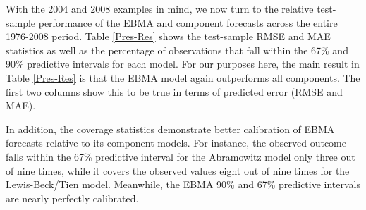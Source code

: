 With the 2004 and 2008 examples in mind, we now turn to the relative
test-sample performance of the EBMA and component forecasts across the
entire 1976-2008 period.  Table \ref{Pres-Res} shows the test-sample
RMSE and MAE statistics as well as the percentage of observations that
fall within the 67\% and 90\% predictive intervals for each model.  For our
purposes here, the main result in Table \ref{Pres-Res} is that the
EBMA model again outperforms all components.  The first two columns
show this to be true in terms of predicted error (RMSE and
MAE).



 In addition, the coverage statistics demonstrate better calibration
 of EBMA forecasts relative to its component models.  For instance,
 the observed outcome falls within the 67\% predictive interval for
 the Abramowitz model only three out of nine times, while it covers the
 observed values eight out of nine times for the Lewis-Beck/Tien
 model.  Meanwhile, the EBMA 90\% and 67\% predictive intervals are
 nearly perfectly calibrated.

